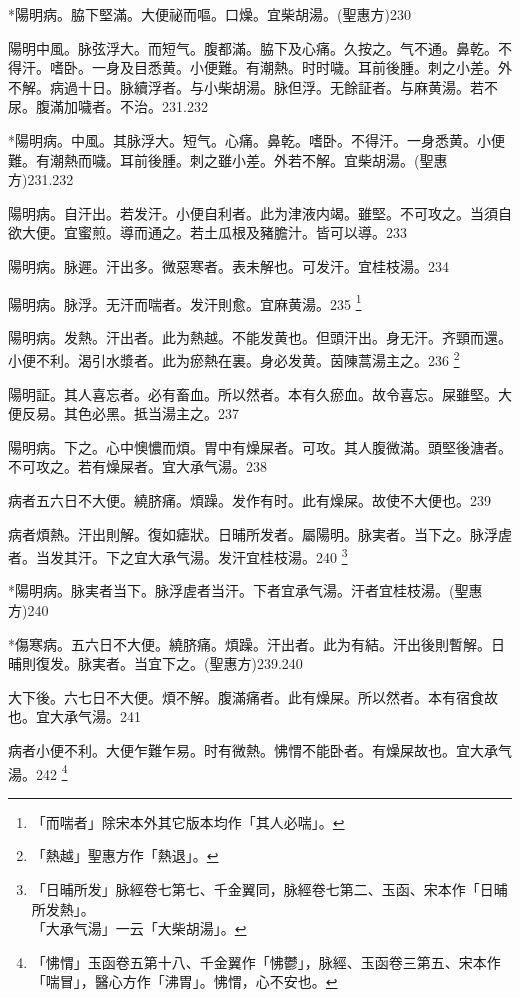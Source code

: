 *陽明病。脇下堅滿。大便祕而嘔。口燥。宜柴胡湯。(聖惠方)230

陽明中風。脉弦浮大。而短气。腹都滿。脇下及心痛。久按之。气不通。鼻乾。不得汗。嗜卧。一身及目悉黄。小便難。有潮熱。时时噦。耳前後腫。刺之小差。外不解。病過十日。脉續浮者。与{\khaaitp 小}柴胡湯。脉但浮。无餘証者。与麻黄湯。若不尿。腹滿加噦者。不治。231.232

*陽明病。中風。其脉浮大。短气。心痛。鼻乾。嗜卧。不得汗。一身悉黄。小便難。有潮熱而噦。耳前後腫。刺之雖小差。外若不解。宜柴胡湯。(聖惠方)231.232

陽明病。自汗出。若发汗。小便自利者。此为{\khaaitp 津液}内竭。雖堅。不可攻之。当須自欲大便。宜蜜煎。導而通之。若土瓜根及豬膽汁。皆可以導。233

陽明病。脉遲。汗出多。微惡寒者。表未解也。可发汗。宜桂枝湯。234

陽明病。脉浮。无汗而喘者。发汗則愈。宜麻黄湯。235
	\footnote{「而喘者」除宋本外其它版本均作「其人必喘」。}

陽明病。发熱。汗出者。此为熱越。不能发黄也。但頭汗出。身无汗。齐頸而還。小便不利。渴引水漿者。此为瘀熱在裏。身必发黄。茵陳{\khaaitp 蒿}湯主之。236
	\footnote{「熱越」聖惠方作「熱退」。}

陽明証。其人喜忘者。必有畜血。所以然者。本有久瘀血。故令喜忘。屎雖堅。大便反易。其色必黑。抵当湯主之。237

陽明病。下之。心中懊憹而煩。胃中有燥屎者。可攻。其人腹微滿。頭堅後溏者。不可攻之。若有燥屎者。宜{\khaaitp 大}承气湯。238

病者五六日不大便。繞脐痛。煩躁。发作有时。此有燥屎。故使不大便也。239

病者煩熱。汗出則解。復如瘧狀。日晡所发者。屬陽明。脉実者。当下之。脉浮虗者。当发其汗。下之宜{\khaaitp 大}承气湯。发汗宜桂枝湯。240
	\footnote{「日晡所发」脉經卷七第七、千金翼同，脉經卷七第二、玉函、宋本作「日晡所发熱」。\\「大承气湯」一云「大柴胡湯」。}

*陽明病。脉実者当下。脉浮虗者当汗。下者宜承气湯。汗者宜桂枝湯。(聖惠方)240

*傷寒病。五六日不大便。繞脐痛。煩躁。汗出者。此为有結。汗出後則暫解。日晡則復发。脉実者。当宜下之。(聖惠方)239.240

大下後。六七日不大便。煩不解。腹滿痛者。此有燥屎。所以然者。本有宿食故也。宜{\khaaitp 大}承气湯。241

病者小便不利。大便乍難乍易。时有微熱。怫㥜不能卧者。有燥屎故也。宜{\khaaitp 大}承气湯。242
	\footnote{「怫㥜」玉函卷五第十八、千金翼作「怫鬱」，脉經、玉函卷三第五、宋本作「喘冒」，醫心方作「沸胃」。怫㥜，心不安也。}

